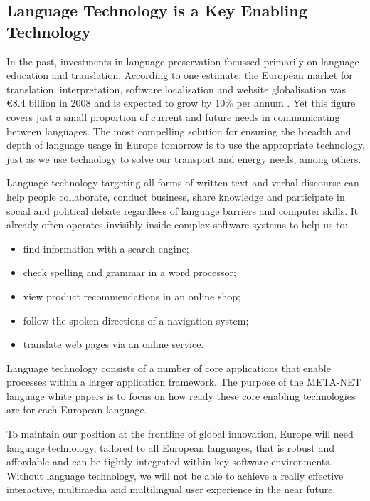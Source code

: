 \begin{multicols}{2}
\subsection{Language Technology is a Key Enabling Technology}

In the past, investments in language preservation focussed primarily on language education and translation. According to one estimate, the European market for translation, interpretation, software localisation and website globalisation was €8.4 billion in 2008 and is expected to grow by 10\% per annum \cite{EC3}. Yet this figure covers just a small proportion of current and future needs in communicating between languages. The most compelling solution for ensuring the breadth and depth of language usage in Europe tomorrow is to use the appropriate technology, just as we use technology to solve our transport and energy needs, among others.

Language technology targeting all forms of written text and verbal discourse can help people collaborate, conduct business, share knowledge and participate in social and political debate regardless of language barriers and computer skills. It already often operates invisibly inside complex software systems to help us to:

\begin{itemize}
\item find information with a search engine;
\item check spelling and grammar in a word processor;
\item view product recommendations in an online shop;
\item follow the spoken directions of a navigation system;
\item translate web pages via an online service.
\end{itemize}

Language technology consists of a number of core applications that enable processes within a larger application framework. The purpose of the META-NET language white papers is to focus on how ready these core enabling technologies are for each European language. 


To maintain our position at the frontline of global innovation, Europe will need language technology, tailored to all European languages, that is robust and affordable and can be tightly integrated within key software environments. Without language technology, we will not be able to achieve a really effective interactive, multimedia and multilingual user experience in the near future.


\end{multicols}
